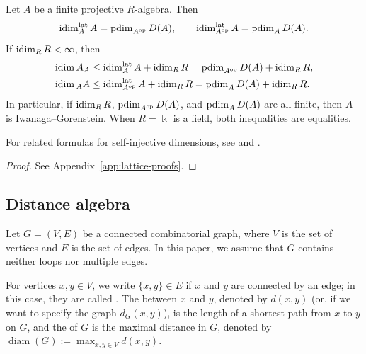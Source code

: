 \documentclass[a4paper,leqno]{amsart}
\begin{document}
\begin{cor}\label{cor:relative-ordinary-injective-dimension}
Let $A$ be a finite projective $R$-algebra. Then
\[
 \operatorname{idim}^{\operatorname{lat}}_A A
 =\operatorname{pdim}_{A^{\operatorname{op}}}D(A),
 \qquad
 \operatorname{idim}^{\operatorname{lat}}_{A^{\operatorname{op}}}A
 =\operatorname{pdim}_A D(A).
\]
If $\operatorname{idim}_R R<\infty$, then
\[
\begin{aligned}
 \operatorname{idim} A_A
 &\leq \operatorname{idim}^{\operatorname{lat}}_A A+\operatorname{idim}_R R
 =\operatorname{pdim}_{A^{\operatorname{op}}}D(A)+\operatorname{idim}_R R,\\
 \operatorname{idim} {}_A A
 &\leq \operatorname{idim}^{\operatorname{lat}}_{A^{\operatorname{op}}}A+\operatorname{idim}_R R
 =\operatorname{pdim}_A D(A)+\operatorname{idim}_R R.
\end{aligned}
\]
In particular, if $\operatorname{idim}_R R$, $\operatorname{pdim}_{A^{\operatorname{op}}}D(A)$, and $\operatorname{pdim}_{A}D(A)$ are all finite, then $A$ is Iwanaga--Gorenstein. 
When $R=\Bbbk$ is a field, both inequalities are equalities.
\end{cor}

\begin{rmk}
For related formulas for self-injective dimensions, see \cite[Proposition~1.1(3)]{GN01} and \cite[Lemma~4.17]{IKWY15}.
\end{rmk}

\begin{proof}
See Appendix~\ref{app:lattice-proofs}.
\end{proof}




\subsection{Distance algebra}

Let $G=(V,E)$ be a connected combinatorial graph, where $V$ is the set of vertices and $E$ is the set of edges. In this paper, we assume that $G$ contains neither loops nor multiple edges.

For vertices $x,y\in V$, we write $\{x,y\}\in E$ if $x$ and $y$ are connected by an edge; in this case, they are called . The  between $x$ and $y$, denoted by $d(x,y)$ (or, if we want to specify the graph $d_G(x,y)$), is the length of a shortest path from $x$ to $y$ on $G$, and the  of $G$ is the maximal distance in $G$, denoted by $\operatorname{diam}(G):=\max_{x,y\in V}d(x,y)$.
\end{document}
